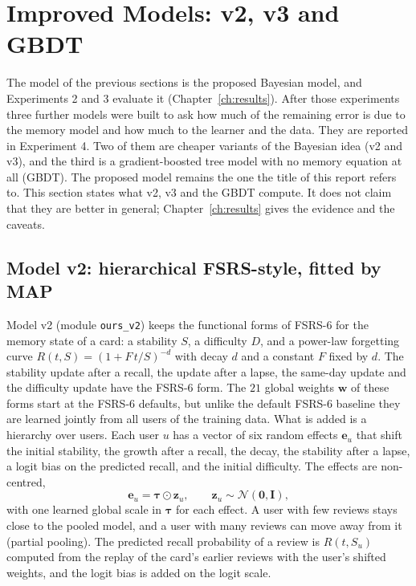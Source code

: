 \section{Improved Models: v2, v3 and GBDT}
\label{sec:method-improved}

The model of the previous sections is the proposed Bayesian model, and Experiments 2 and 3 evaluate it
(Chapter~\ref{ch:results}). After those experiments three further models were built to ask how much of
the remaining error is due to the memory model and how much to the learner and the data. They are
reported in Experiment 4. Two of them are cheaper variants of the Bayesian idea (v2 and v3), and the
third is a gradient-boosted tree model with no memory equation at all (GBDT). The proposed model
remains the one the title of this report refers to. This section states what v2, v3 and the GBDT
compute. It does not claim that they are better in general; Chapter~\ref{ch:results} gives the
evidence and the caveats.

\subsection{Model v2: hierarchical FSRS-style, fitted by MAP}
\label{sec:method-v2}

Model v2 (module \texttt{ours\_v2}) keeps the functional forms of FSRS-6 for the memory state of a card:
a stability $S$, a difficulty $D$, and a power-law forgetting curve $R(t, S) = (1 + F\,t/S)^{-d}$ with
decay $d$ and a constant $F$ fixed by $d$. The stability update after a recall, the update after a
lapse, the same-day update and the difficulty update have the FSRS-6 form. The $21$ global weights
$\mathbf{w}$ of these forms start at the FSRS-6 defaults, but unlike the default FSRS-6 baseline they are
learned jointly from all users of the training data. What is added is a hierarchy over users. Each user
$u$ has a vector of six random effects $\mathbf{e}_u$ that shift the initial stability, the growth after a
recall, the decay, the stability after a lapse, a logit bias on the predicted recall, and the initial difficulty. The effects are
non-centred,
\begin{equation}
  \mathbf{e}_u = \boldsymbol{\tau} \odot \mathbf{z}_u, \qquad \mathbf{z}_u \sim \mathcal{N}(\mathbf{0}, \mathbf{I}),
  \label{eq:v2-effects}
\end{equation}
with one learned global scale in $\boldsymbol{\tau}$ for each effect. A user with few reviews stays close
to the pooled model, and a user with many reviews can move away from it (partial pooling). The predicted
recall probability of a review is $R(t, S_u)$ computed from the replay of the card's earlier reviews with the
user's shifted weights, and the logit bias is added on the logit scale.

